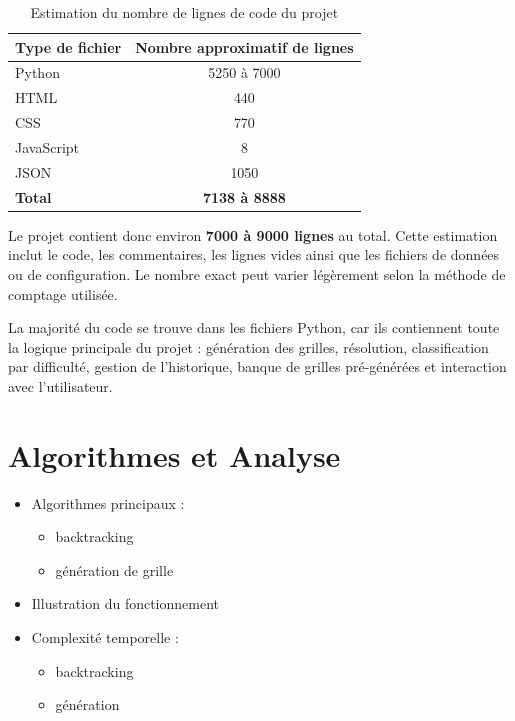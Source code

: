 \documentclass[a4paper]{article}
\begin{document}
\begin{table}[h]
    \centering
    \begin{tabular}{|l|c|}
        \hline
        \textbf{Type de fichier} & \textbf{Nombre approximatif de lignes} \\
        \hline
        Python & 5250 à 7000 \\
        \hline
        HTML & 440 \\
        \hline
        CSS & 770 \\
        \hline
        JavaScript & 8 \\
        \hline
        JSON & 1050 \\
        \hline
        \textbf{Total} & \textbf{7138 à 8888} \\
        \hline
    \end{tabular}
    \caption{Estimation du nombre de lignes de code du projet}
    \label{tab:stats-lignes}
\end{table}

Le projet contient donc environ \textbf{7000 à 9000 lignes} au total. Cette estimation inclut le code, les commentaires, les lignes vides ainsi que les fichiers de données ou de configuration. Le nombre exact peut varier légèrement selon la méthode de comptage utilisée.

La majorité du code se trouve dans les fichiers Python, car ils contiennent toute la logique principale du projet : génération des grilles, résolution, classification par difficulté, gestion de l'historique, banque de grilles pré-générées et interaction avec l'utilisateur.

\section{Algorithmes et Analyse}

\begin{itemize}
    \item Algorithmes principaux :
    \begin{itemize}
        \item backtracking
        \item génération de grille
    \end{itemize}
    \item Illustration du fonctionnement
    \item Complexité temporelle :
    \begin{itemize}
        \item backtracking
        \item génération
    \end{itemize}
\end{itemize}
\end{document}
